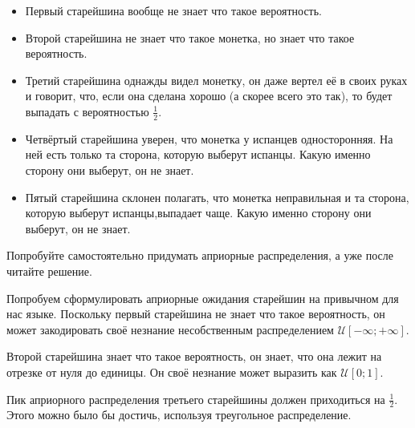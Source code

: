 \documentclass[12pt, a4paper, oneside]{extreport}
\def \mU{\mathcal{U}}
\theoremstyle{plain}              %
\theoremstyle{definition}         %
\begin{document}
\begin{itemize}
	\item Первый старейшина вообще не знает что такое вероятность.
	\item Второй старейшина не знает что такое монетка, но знает что такое вероятность. 
	\item Третий старейшина однажды видел монетку, он даже вертел её в своих руках и говорит, что, если она сделана хорошо (а скорее всего это так), то будет выпадать с  вероятностью $\frac{1}{2}$. 
	\item Четвёртый старейшина уверен, что монетка у испанцев односторонняя. На ней есть только та сторона, которую выберут испанцы. Какую именно сторону они выберут, он не знает.
	\item Пятый старейшина склонен полагать, что монетка неправильная и та сторона, которую выберут испанцы,выпадает чаще. Какую именно сторону они выберут, он не знает.
\end{itemize}

Попробуйте самостоятельно придумать априорные распределения, а уже после читайте решение. 

Попробуем сформулировать априорные ожидания старейшин на привычном для нас языке. Поскольку первый старейшина не знает что такое вероятность, он может закодировать своё незнание несобственным распределением $\mU [-\infty; +\infty]$. 

Второй старейшина знает что такое вероятность, он знает, что она лежит на отрезке от нуля до единицы. Он своё незнание может выразить как $\mU [0;1]$.

Пик априорного распределения третьего старейшины должен приходиться на $\frac{1}{2}$. Этого можно было бы достичь, используя треугольное распределение.
\end{document}
